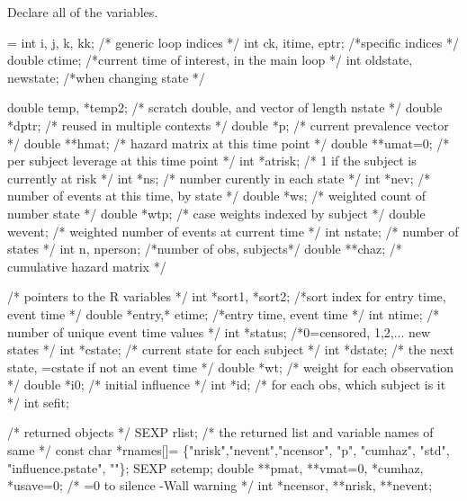 \documentclass{article}
\begin{document}
Declare all of the variables.
\begin{nwchunk}
=
 int i, j, k, kk;   /* generic loop indices */
 int ck, itime, eptr; /*specific indices */
 double ctime;      /*current time of interest, in the main loop */
 int oldstate, newstate; /*when changing state */
 
 double temp, *temp2;  /* scratch double, and vector of length nstate */
 double *dptr;      /* reused in multiple contexts */
 double *p;         /* current prevalence vector */
 double **hmat;      /* hazard matrix at this time point */
 double **umat=0;     /* per subject leverage at this time point */
 int *atrisk;       /* 1 if the subject is currently at risk */
 int   *ns;         /* number curently in each state */
 int   *nev;        /* number of events at this time, by state */
 double *ws;        /* weighted count of number state */
 double *wtp;       /* case weights indexed by subject */
 double wevent;     /* weighted number of events at current time */
 int nstate;        /* number of states */
 int n, nperson;    /*number of obs, subjects*/
 double **chaz;     /* cumulative hazard matrix */
 
 /* pointers to the R variables */
 int *sort1, *sort2;  /*sort index for entry time, event time */
 double *entry,* etime;  /*entry time, event time */
 int ntime;          /* number of unique event time values */
 int *status;        /*0=censored, 1,2,... new states */
 int *cstate;        /* current state for each subject */
 int *dstate;        /* the next state, =cstate if not an event time */
 double *wt;         /* weight for each observation */
 double *i0;         /* initial influence */
 int *id;            /* for each obs, which subject is it */
 int sefit;
     
 /* returned objects */
 SEXP rlist;         /* the returned list and variable names of same */  
 const char *rnames[]= \{"nrisk","nevent","ncensor", "p", 
                        "cumhaz", "std", "influence.pstate", ""\};
 SEXP setemp;
 double **pmat, **vmat=0, *cumhaz, *usave=0; /* =0 to silence -Wall warning */
 int  *ncensor, **nrisk, **nevent;
\end{nwchunk}
\end{document}
